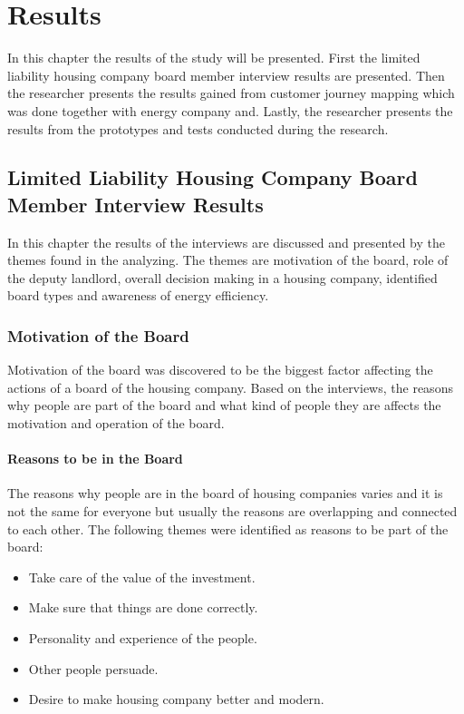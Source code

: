 \chapter{Results}
\label{chapter:results}

In this chapter the results of the study will be presented. First the limited liability housing company board member interview results are presented. Then the researcher presents the results gained from customer journey mapping which was done together with energy company and. Lastly, the researcher presents the results from the prototypes and tests conducted during the research. 

\section{Limited Liability Housing Company Board Member Interview Results}
\label{section:interviews}
In this chapter the results of the interviews are discussed and presented by the themes found in the analyzing. The themes are motivation of the board, role of the deputy landlord, overall decision making in a housing company, identified board types and awareness of energy efficiency.

\subsection{Motivation of the Board}

Motivation of the board was discovered to be the biggest factor affecting the actions of a board of the housing company. Based on the interviews, the reasons why people are part of the board and what kind of people they are affects the motivation and operation of the board.

\subsubsection*{Reasons to be in the Board}

The reasons why people are in the board of housing companies varies and it is not the same for everyone but usually the reasons are overlapping and connected to each other. The following themes were identified as reasons to be part of the board:
\begin{itemize}
	\setlength{\itemsep}{1pt}
	\item Take care of the value of the investment.
	\item Make sure that things are done correctly.
	\item Personality and experience of the people.
	\item Other people persuade.
	\item Desire to make housing company better and modern.
\end{itemize}

